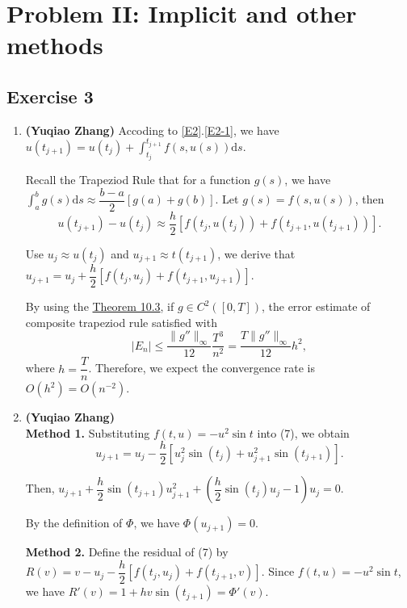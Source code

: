 \documentclass[11pt]{article}
\begin{document}
\section{Problem II: Implicit and other methods}

\subsection{Exercise 3} 

\begin{enumerate}
    \item \label{E3-1} \textbf{(Yuqiao Zhang)} Accoding to \ref{E2}.\ref{E2-1}, we have $\displaystyle u(t_{j+1})=u(t_j)+\int_{t_j}^{t_{j+1}}f(s,u(s)) \mathrm{d}s$.

            Recall the Trapeziod Rule that for a function $g(s)$, we have $\displaystyle \int_a^b g(s) \mathrm{d}s \approx \dfrac{b-a}{2} \left[g(a) + g(b)\right]$. Let $g(s) = f\left(s ,u(s)\right)$, then $$u\left(t_{j+1}\right) - u \left(t_j \right) \approx  \dfrac{h}{2} \left[f\left(t_j,u\left(t_j\right)\right) + f\left(t_{j+1},u\left(t_{j+1}\right)\right)\right]. $$

            Use $u_j \approx u\left(t_j\right)$ and $u_{j+1} \approx t\left(t_{j+1}\right)$, we derive that $u_{j+1}=u_j+\dfrac{h}{2} \left[f\left(t_j,u_j\right)+f\left(t_{j+1},u_{j+1}\right)\right]$. 

            By using the \href{https://jackrthomas.github.io/Math5485/lectures/L10.html\#trapezoid-rule}{Theorem 10.3}, if $g \in C^2 \left(\left[0, T\right]\right)$, the error estimate of composite trapeziod rule satisfied with $$\left| E_n \right| \le \dfrac{\|g''\|_\infty}{12}\dfrac{T^3}{n^2} = \dfrac{T\|g''\|_\infty}{12}h^2, $$ where $h = \dfrac{T}{n}$. Therefore, we expect the convergence rate is $O\left(h^2\right) = O\left(n^{-2}\right)$. 

    \item \textbf{(Yuqiao Zhang)} \\ 
        \textbf{Method 1.} Substituting $f(t,u)=-u^2\sin t$ into (7), we obtain
        $$u_{j+1}=u_j-\dfrac{h}{2} \left[u_j^2\sin(t_j)+u_{j+1}^2\sin(t_{j+1})\right].$$

        Then, $u_{j+1}+\dfrac{h}{2}\sin(t_{j+1})u_{j+1}^2 +\left(\dfrac{h}{2}\sin(t_j)u_j-1\right)u_j=0.$

        By the definition of $\Phi$, we have $\Phi(u_{j+1})=0$. 

        \textbf{Method 2.} Define the residual of (7) by $R(v)=v-u_j-\dfrac{h}{2} [f(t_j,u_j)+f(t_{j+1},v)]$. Since $f(t,u) = -u^2 \sin t$, we have $R'(v)=1+hv\sin(t_{j+1})=\Phi'(v)$. 


\end{enumerate}
\end{document}
